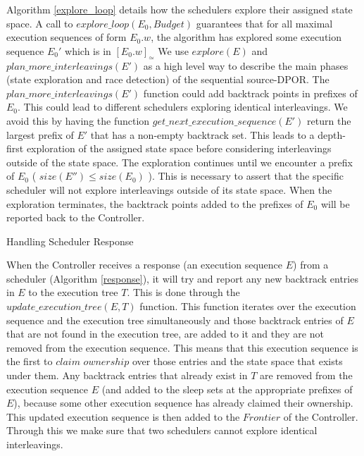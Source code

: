 Algorithm \ref{explore_loop} details how the schedulers explore their assigned state space.
A call to $explore\_loop(E_0, Budget)$ guarantees that for all maximal execution 
sequences of form $E_0.w$, the algorithm has explored some execution sequence $E_0'$ which is in $[E_0.w]_\simeq$ 
We use $explore(E)$ and 
$ plan\_more\_interleavings(E') $ as a high level way to describe the main phases (state exploration and 
race detection) of the sequential source-DPOR. The $ plan\_more\_interleavings(E') $ function
could add backtrack points in prefixes of $E_0$. This could lead to different schedulers exploring
identical interleavings. We avoid this by having 
the function $ get\_next\_execution\_sequence(E')$ return 
the largest prefix of $E'$ that has a non-empty backtrack set. This leads to a depth-first exploration of the assigned
state space before considering interleavings outside of the state space. The exploration
continues until we encounter a prefix of $E_0$ ( $size(E'') \leq size(E_0)$ ). This is necessary to 
assert that the specific scheduler will not explore interleavings outside of its state space. When the exploration
terminates, the backtrack points added to the prefixes of $E_0$ will be reported back to the Controller.

\begin{algorithm}
    \caption{Handling Scheduler Response}
    \label{response}
\end{algorithm}


When the Controller receives a response (an execution sequence $E$) from a scheduler (Algorithm \ref{response}), it will 
try and report any new
backtrack entries in $E$ to the execution tree $T$. This is done
through the $update\_execution\_tree(E, T)$ function. This function
iterates over the execution sequence and the execution tree simultaneously and those backtrack entries of $E$ that are not found
in the execution tree, are added to it and they are not removed from the execution sequence. This means that 
this execution sequence is the first to $claim$ $ownership$ over those entries and the state space
that exists under them. Any backtrack entries that already exist in $T$ are removed from the 
execution sequence $E$ (and added to the sleep sets at the appropriate prefixes of $E$),
because some other execution sequence has already claimed their ownership. This updated execution sequence is then 
added to the $Frontier$ of the Controller. Through this we make sure that two schedulers cannot explore identical
interleavings.

